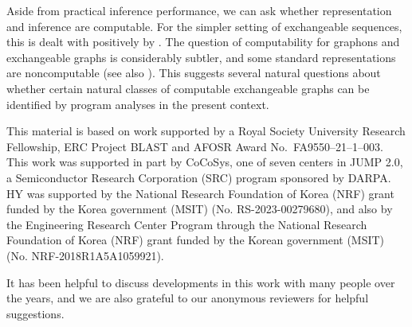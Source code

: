 Aside from practical inference performance, we can ask whether representation and inference are computable.
For the simpler setting of exchangeable sequences, this is dealt with positively by  \cite{freer2012computable, pmlr-v9-freer10a}.
The question of computability for graphons and exchangeable graphs is considerably subtler,
and some standard representations are noncomputable
\cite{ackerman2019algorithmic} (see also \cite{CompExch-PPS2017}).
This suggests several natural questions about whether certain natural classes of computable exchangeable graphs
can be identified by program analyses in the present context.%




\begin{acks}
  This material is based on work supported by a Royal Society University Research Fellowship, ERC Project BLAST and AFOSR Award No.~FA9550–21–1–003. This work was supported in part by CoCoSys, one of seven centers in JUMP 2.0, a Semiconductor Research Corporation (SRC) program sponsored by DARPA. HY was supported by the National Research Foundation of Korea (NRF) grant funded by the Korea government (MSIT) (No. RS-2023-00279680), and also by the Engineering Research Center Program through the National Research Foundation of Korea (NRF) grant funded by the Korean government (MSIT) (No. NRF-2018R1A5A1059921).

It has been helpful to discuss developments in this work with many people over the years, and we are also grateful to our anonymous reviewers for helpful suggestions. 
\end{acks}

\enlargethispage{\baselineskip}
